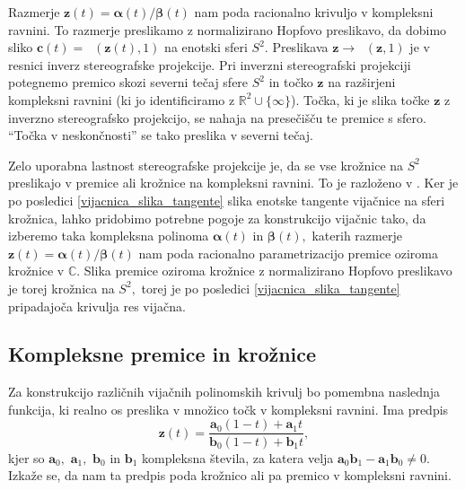 \documentclass[12pt,a4paper,twoside]{article}
\theoremstyle{definition} %
\theoremstyle{plain} %
\theoremstyle{primerstyle}
\numberwithin{equation}{section}  %
\newcommand{\R}{\mathbb R}
\renewcommand{\C}{\mathbb C}
\newcommand{\aV}{\mathbf{a}}
\newcommand{\bV}{\mathbf{b}}
\newcommand{\cV}{\mathbf{c}}
\newcommand{\zV}{\mathbf{z}}
\newcommand{\balpha}{\boldsymbol \alpha}
\newcommand{\bbeta}{\boldsymbol \beta}
\DeclareMathOperator{\nhopf}{\hat{H}}
\begin{document}
Razmerje $\zV(t)=\balpha(t)/\bbeta(t)$ nam poda racionalno krivuljo v kompleksni ravnini. To razmerje preslikamo z normalizirano Hopfovo preslikavo, da dobimo sliko $\cV(t)=\nhopf(\zV(t),1)$ na enotski sferi $S^2.$ Preslikava $\zV\to\nhopf(\zV,1)$ je v resnici inverz stereografske projekcije. Pri inverzni stereografski projekciji potegnemo premico skozi severni tečaj sfere $S^2$ in točko $\zV$ na razširjeni kompleksni ravnini (ki jo identificiramo z $\R^2\cup\{\infty\}$). Točka, ki je slika točke $\zV$ z inverzno stereografsko projekcijo, se nahaja na presečišču te premice s sfero. ``Točka v neskončnosti'' se tako preslika v severni tečaj.

Zelo uporabna lastnost stereografske projekcije je, da se vse krožnice na $S^2$ preslikajo v premice ali krožnice na kompleksni ravnini. To je razloženo v \cite[pogl.\ ``Stereographic projection'']{needham1998visual}. Ker je po posledici \ref{vijacnica_slika_tangente} slika enotske tangente vijačnice na sferi krožnica, lahko pridobimo potrebne pogoje za konstrukcijo vijačnic tako, da izberemo taka kompleksna polinoma $\balpha(t)$ in $\bbeta(t),$ katerih razmerje $\zV(t)=\balpha(t)/\bbeta(t)$ nam poda racionalno parametrizacijo premice oziroma krožnice v $\C.$ Slika premice oziroma krožnice z normalizirano Hopfovo preslikavo je torej krožnica na $S^2,$ torej je po posledici \ref{vijacnica_slika_tangente} pripadajoča krivulja res vijačna.

\subsection{Kompleksne premice in krožnice}
\label{poglavje_kompleksne_premice_kroznice}

Za konstrukcijo različnih vijačnih polinomskih krivulj bo pomembna naslednja funkcija, ki realno os preslika v množico točk v kompleksni ravnini. Ima predpis
\begin{equation}
	\label{transformacija}
	\zV(t)=\frac{\aV_0(1-t)+\aV_1t}{\bV_0(1-t)+\bV_1t},
\end{equation}
kjer so $\aV_0,$ $\aV_1,$ $\bV_0$ in $\bV_1$ kompleksna števila, za katera velja $\aV_0\bV_1-\aV_1\bV_0\neq 0.$ Izkaže se, da nam ta predpis poda krožnico ali pa premico v kompleksni ravnini.%
\end{document}
